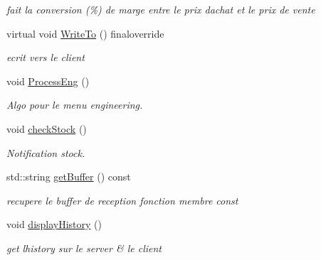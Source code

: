 \begin{DoxyCompactItemize}
\begin{DoxyCompactList}\small\item\em fait la conversion (\%) de marge entre le prix d\textquotesingle{}achat et le prix de vente \end{DoxyCompactList}\item 
virtual void \hyperlink{classServerEngmenu_a76e2b435cd107127382e0b07a393fb9a}{Write\+To} () finaloverride\hypertarget{classServerEngmenu_a76e2b435cd107127382e0b07a393fb9a}{}\label{classServerEngmenu_a76e2b435cd107127382e0b07a393fb9a}

\begin{DoxyCompactList}\small\item\em ecrit vers le client \end{DoxyCompactList}\item 
void \hyperlink{classServerEngmenu_acc59cd666aa2872d02d8a1e6d5968871}{Process\+Eng} ()
\begin{DoxyCompactList}\small\item\em Algo pour le menu engineering. \end{DoxyCompactList}\item 
void \hyperlink{classServerEngmenu_ac5a8167a38a4595138cb6b7e29f2e07a}{check\+Stock} ()\hypertarget{classServerEngmenu_ac5a8167a38a4595138cb6b7e29f2e07a}{}\label{classServerEngmenu_ac5a8167a38a4595138cb6b7e29f2e07a}

\begin{DoxyCompactList}\small\item\em Notification stock. \end{DoxyCompactList}\item 
std\+::string \hyperlink{classServerEngmenu_a5ffe62bedb32bd3b66b26d7771a3eff0}{get\+Buffer} () const \hypertarget{classServerEngmenu_a5ffe62bedb32bd3b66b26d7771a3eff0}{}\label{classServerEngmenu_a5ffe62bedb32bd3b66b26d7771a3eff0}

\begin{DoxyCompactList}\small\item\em recupere le buffer de reception fonction membre const \end{DoxyCompactList}\item 
void \hyperlink{classServerEngmenu_a59623ef2f5950cae163f950ebb3d9a08}{display\+History} ()\hypertarget{classServerEngmenu_a59623ef2f5950cae163f950ebb3d9a08}{}\label{classServerEngmenu_a59623ef2f5950cae163f950ebb3d9a08}

\begin{DoxyCompactList}\small\item\em get l\textquotesingle{}history sur le server \& le client \end{DoxyCompactList}\end{DoxyCompactItemize}


